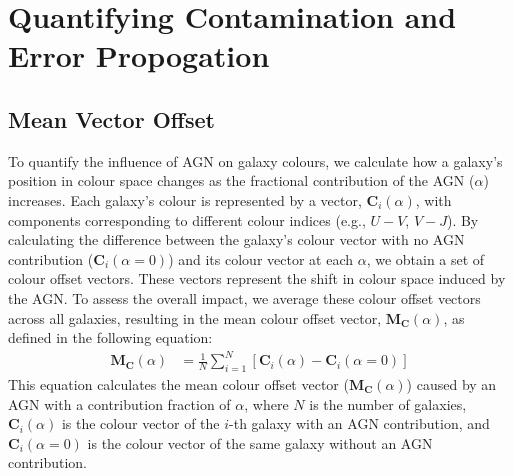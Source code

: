 \section{Quantifying Contamination and Error Propogation}
\subsection{Mean Vector Offset}

To quantify the influence of AGN on galaxy colours, we calculate how a galaxy's position in colour space changes as the fractional contribution of the AGN ($\alpha$) increases. Each galaxy's colour is represented by a vector, $\mathbf{C}_i(\alpha)$, with components corresponding to different colour indices (e.g., $U-V$, $V-J$).  By calculating the difference between the galaxy's colour vector with no AGN contribution ($\mathbf{C}_i(\alpha = 0)$) and its colour vector at each $\alpha$, we obtain a set of colour offset vectors. These vectors represent the shift in colour space induced by the AGN.  To assess the overall impact, we average these colour offset vectors across all galaxies, resulting in the mean colour offset vector,  $\mathbf{M_C}(\alpha)$, as defined in the following equation:
\begin{align*}
\mathbf{M_C}(\alpha) &= \frac{1}{N} \sum_{i=1}^{N} \left[ \mathbf{C}_i(\alpha) - \mathbf{C}_i(\alpha = 0) \right]
\end{align*}
This equation calculates the mean colour offset vector ($\mathbf{M_C}(\alpha)$) caused by an AGN with a contribution fraction of $\alpha$, where $N$ is the number of galaxies, $\mathbf{C}_i(\alpha)$ is the colour vector of the $i$-th galaxy with an AGN contribution, and $\mathbf{C}_i(\alpha = 0)$ is the colour vector of the same galaxy without an AGN contribution.

